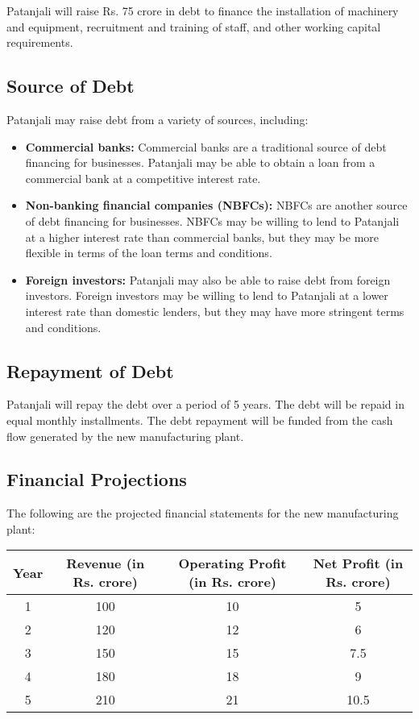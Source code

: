 Patanjali will raise Rs. 75 crore in debt to finance the installation of machinery and equipment, recruitment and training of staff, and other working capital requirements.

\subsection{Source of Debt}

Patanjali may raise debt from a variety of sources, including:

\begin{itemize}
    \item \textbf{Commercial banks:} Commercial banks are a traditional source of debt financing for businesses. Patanjali may be able to obtain a loan from a commercial bank at a competitive interest rate.
    \item \textbf{Non-banking financial companies (NBFCs):} NBFCs are another source of debt financing for businesses. NBFCs may be willing to lend to Patanjali at a higher interest rate than commercial banks, but they may be more flexible in terms of the loan terms and conditions.
    \item \textbf{Foreign investors:} Patanjali may also be able to raise debt from foreign investors. Foreign investors may be willing to lend to Patanjali at a lower interest rate than domestic lenders, but they may have more stringent terms and conditions.
\end{itemize}

\subsection{Repayment of Debt}

Patanjali will repay the debt over a period of 5 years. The debt will be repaid in equal monthly installments. The debt repayment will be funded from the cash flow generated by the new manufacturing plant.

\subsection{Financial Projections}

The following are the projected financial statements for the new manufacturing plant:

\begin{center}
\begin{tabular}{|c|c|c|c|}
\hline
\textbf{Year} & \textbf{Revenue (in Rs. crore)} & \textbf{Operating Profit (in Rs. crore)} & \textbf{Net Profit (in Rs. crore)} \\
\hline
1 & 100 & 10 & 5 \\
2 & 120 & 12 & 6 \\
3 & 150 & 15 & 7.5 \\
4 & 180 & 18 & 9 \\
5 & 210 & 21 & 10.5 \\
\hline
\end{tabular}
\end{center}

